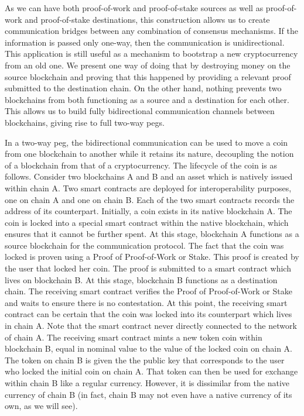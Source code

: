 As we can have both proof-of-work and proof-of-stake sources as well as
proof-of-work and proof-of-stake destinations, this construction allows us to
create communication bridges between any combination of consensus mechanisms.
If the information is passed only one-way, then the communication is
unidirectional. This application is still useful as a mechanism to bootstrap a
new cryptocurrency from an old one. We present one way of doing that by
destroying money on the source blockchain and proving that this happened by
providing a relevant proof submitted to the destination chain. On the other
hand, nothing prevents two blockchains from both functioning as a source and a
destination for each other. This allows us to build fully bidirectional
communication channels between blockchains, giving rise to full two-way pegs.

In a two-way peg, the bidirectional communication can be used to move a coin
from one blockchain to another while it retains its nature, decoupling the
notion of a blockchain from that of a cryptocurrency. The lifecycle of the coin
is as follows. Consider two blockchains A and B and an asset which is natively
issued within chain A. Two smart contracts are deployed for interoperability
purposes, one on chain A and one on chain B. Each of the two smart contracts
records the address of its counterpart. Initially, a coin exists in its native
blockchain A. The coin is locked into a special smart contract within the native
blockchain, which ensures that it cannot be further spent. At this stage,
blockchain A functions as a source blockchain for the communication protocol.
The fact that the coin was locked is proven using a Proof of Proof-of-Work or
Stake. This proof
is created by the user that locked her coin. The proof is submitted to a smart
contract which lives on blockchain B. At this stage, blockchain B functions as a
destination chain. The receiving smart contract verifies the Proof of Proof-of-Work
or Stake and
waits to ensure there is no contestation. At this point, the receiving smart
contract can be certain that the coin was locked into its counterpart which
lives in chain A. Note that the smart contract never directly connected to the
network of chain A. The receiving smart contract mints a new token coin within
blockchain B, equal in nominal value to the value of the locked coin on chain A.
The token on chain B is given the the public key that corresponds to the user
who locked the initial coin on chain A. That token can then be used for exchange
within chain B like a regular currency. However, it is dissimilar from the
native currency of chain B (in fact, chain B may not even have a native currency
of its own, as we will see).

